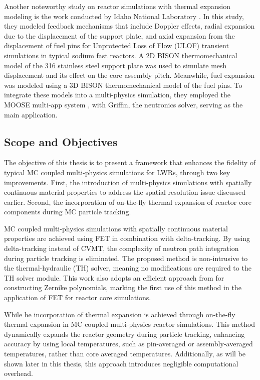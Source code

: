 Another noteworthy study on reactor simulations with thermal expansion modeling is the work conducted by Idaho National Laboratory \cite{cole_2021}. In this study, they modeled feedback mechanisms that include Doppler effects, radial expansion due to the displacement of the support plate, and axial expansion from the displacement of fuel pins for Unprotected Loss of Flow (ULOF) transient simulations in typical sodium fast reactors. A 2D BISON thermomechanical model of the 316 stainless steel support plate was used to simulate mesh displacement and its effect on the core assembly pitch. Meanwhile, fuel expansion was modeled using a 3D BISON thermomechanical model of the fuel pins. To integrate these models into a multi-physics simulation, they employed the MOOSE multi-app system \cite{moose_2020}, with Griffin, the neutronics solver, serving as the main application.

\subsection{Scope and Objectives}

The objective of this thesis is to present a framework that enhances the fidelity of typical MC coupled multi-physics simulations for LWRs, through two key improvements. First, the introduction of multi-physics simulations with spatially continuous material properties \cite{imron_2024} to address the spatial resolution issue discussed earlier. Second, the incorporation of on-the-fly thermal expansion of reactor core components during MC particle tracking.

MC coupled multi-physics simulations with spatially continuous material properties are achieved using FET in combination with delta-tracking. By using delta-tracking instead of CVMT, the complexity of neutron path integration during particle tracking is eliminated. The proposed method is non-intrusive to the thermal-hydraulic (TH) solver, meaning no modifications are required to the TH solver module. This work also adopts an efficient approach from \cite{honarvar} for constructing Zernike polynomials, marking the first use of this method in the application of FET for reactor core simulations.

While he incorporation of thermal expansion is achieved through on-the-fly thermal expansion in MC coupled multi-physics reactor simulations. This method dynamically expands the reactor geometry during particle tracking, enhancing accuracy by using local temperatures, such as pin-averaged or assembly-averaged temperatures, rather than core averaged temperatures. Additionally, as will be shown later in this thesis, this approach introduces negligible computational overhead.

